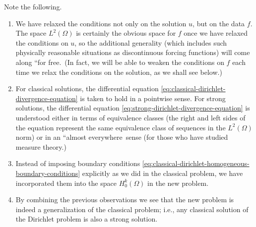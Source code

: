 Note the following.\begin{enumerate}\item We have relaxed the conditions not only on the solution $u$, but on the data $f$. The space $L^2(\Omega)$ is certainly the obvious space for $f$ once we have relaxed the conditions on $u$, so the additional generality (which includes such physically reasonable situations as discontinuous forcing functions) will come along ``for free.\textquotesingle\textquotesingle\ (In fact, we will be able to weaken the conditions on $f$ each time we relax the conditions on the solution, as we shall see below.)\item For classical solutions, the differential equation \eqref{eq:classical-dirichlet-divergence-equation} is taken to hold in a pointwise sense. For strong solutions, the differential equation \eqref{eq:strong-dirichlet-divergence-equation} is understood either in terms of equivalence classes (the right and left sides of the equation represent the same equivalence class of sequences in the $L^2(\Omega)$ norm) or in an ``almost everywhere\textquotesingle\textquotesingle\ sense (for those who have studied measure theory.)\item Instead of imposing boundary conditions \eqref{eq:classical-dirichlet-homogeneous-boundary-conditions} explicitly as we did in the classical problem, we have incorporated them into the space $H_0^k(\Omega)$ in the new problem.\item By combining the previous observations we see that the new problem is indeed a generalization of the classical problem; i.e., any classical solution of the Dirichlet problem is also a strong solution.\end{enumerate}

